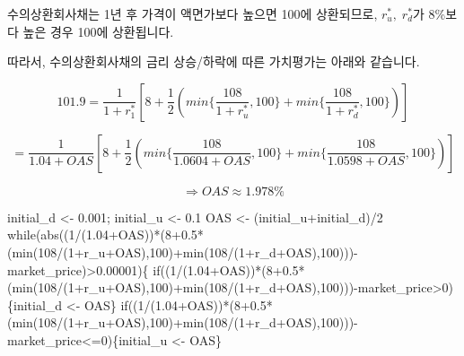 \documentclass[
  a4paper,
  DIV=11,
  numbers=noendperiod]{scrreprt}
\newenvironment{Shaded}{\begin{snugshade}}{\end{snugshade}}
\newcommand{\ControlFlowTok}[1]{\textcolor[rgb]{0.00,0.23,0.31}{#1}}
\newcommand{\DecValTok}[1]{\textcolor[rgb]{0.68,0.00,0.00}{#1}}
\newcommand{\FloatTok}[1]{\textcolor[rgb]{0.68,0.00,0.00}{#1}}
\newcommand{\FunctionTok}[1]{\textcolor[rgb]{0.28,0.35,0.67}{#1}}
\newcommand{\NormalTok}[1]{\textcolor[rgb]{0.00,0.23,0.31}{#1}}
\newcommand{\OtherTok}[1]{\textcolor[rgb]{0.00,0.23,0.31}{#1}}
\newcommand{\SpecialCharTok}[1]{\textcolor[rgb]{0.37,0.37,0.37}{#1}}
\begin{document}
수의상환회사채는 1년 후 가격이 액면가보다 높으면 100에 상환되므로,
\(r_u^*,\;r_d^*\)가 8\%보다 높은 경우 100에 상환됩니다.

따라서, 수의상환회사채의 금리 상승/하락에 따른 가치평가는 아래와
같습니다.

\[101.9=\frac{1}{1+r_1^*}[8+\frac{1}{2}(min\{\frac{108}{1+r_u^*},100\}+min\{\frac{108}{1+r_d^*},100\})]\]

\[=\frac{1}{1.04+OAS}[8+\frac{1}{2}(min\{\frac{108}{1.0604+OAS},100\}+min\{\frac{108}{1.0598+OAS},100\})]\]

\[\Rightarrow OAS\approx 1.978\%\]

\begin{Shaded}
\begin{Highlighting}[]
\NormalTok{initial\_d }\OtherTok{\textless{}{-}} \FloatTok{0.001}\NormalTok{; initial\_u }\OtherTok{\textless{}{-}} \FloatTok{0.1}
\NormalTok{OAS }\OtherTok{\textless{}{-}}\NormalTok{ (initial\_u}\SpecialCharTok{+}\NormalTok{initial\_d)}\SpecialCharTok{/}\DecValTok{2}
\ControlFlowTok{while}\NormalTok{(}\FunctionTok{abs}\NormalTok{((}\DecValTok{1}\SpecialCharTok{/}\NormalTok{(}\FloatTok{1.04}\SpecialCharTok{+}\NormalTok{OAS))}\SpecialCharTok{*}\NormalTok{(}\DecValTok{8}\FloatTok{+0.5}\SpecialCharTok{*}\NormalTok{(}\FunctionTok{min}\NormalTok{(}\DecValTok{108}\SpecialCharTok{/}\NormalTok{(}\DecValTok{1}\SpecialCharTok{+}\NormalTok{r\_u}\SpecialCharTok{+}\NormalTok{OAS),}\DecValTok{100}\NormalTok{)}\SpecialCharTok{+}\FunctionTok{min}\NormalTok{(}\DecValTok{108}\SpecialCharTok{/}\NormalTok{(}\DecValTok{1}\SpecialCharTok{+}\NormalTok{r\_d}\SpecialCharTok{+}\NormalTok{OAS),}\DecValTok{100}\NormalTok{)))}\SpecialCharTok{{-}}\NormalTok{market\_price)}\SpecialCharTok{\textgreater{}}\FloatTok{0.00001}\NormalTok{)\{}
  \ControlFlowTok{if}\NormalTok{((}\DecValTok{1}\SpecialCharTok{/}\NormalTok{(}\FloatTok{1.04}\SpecialCharTok{+}\NormalTok{OAS))}\SpecialCharTok{*}\NormalTok{(}\DecValTok{8}\FloatTok{+0.5}\SpecialCharTok{*}\NormalTok{(}\FunctionTok{min}\NormalTok{(}\DecValTok{108}\SpecialCharTok{/}\NormalTok{(}\DecValTok{1}\SpecialCharTok{+}\NormalTok{r\_u}\SpecialCharTok{+}\NormalTok{OAS),}\DecValTok{100}\NormalTok{)}\SpecialCharTok{+}\FunctionTok{min}\NormalTok{(}\DecValTok{108}\SpecialCharTok{/}\NormalTok{(}\DecValTok{1}\SpecialCharTok{+}\NormalTok{r\_d}\SpecialCharTok{+}\NormalTok{OAS),}\DecValTok{100}\NormalTok{)))}\SpecialCharTok{{-}}\NormalTok{market\_price}\SpecialCharTok{\textgreater{}}\DecValTok{0}\NormalTok{)\{initial\_d }\OtherTok{\textless{}{-}}\NormalTok{ OAS\}}
  \ControlFlowTok{if}\NormalTok{((}\DecValTok{1}\SpecialCharTok{/}\NormalTok{(}\FloatTok{1.04}\SpecialCharTok{+}\NormalTok{OAS))}\SpecialCharTok{*}\NormalTok{(}\DecValTok{8}\FloatTok{+0.5}\SpecialCharTok{*}\NormalTok{(}\FunctionTok{min}\NormalTok{(}\DecValTok{108}\SpecialCharTok{/}\NormalTok{(}\DecValTok{1}\SpecialCharTok{+}\NormalTok{r\_u}\SpecialCharTok{+}\NormalTok{OAS),}\DecValTok{100}\NormalTok{)}\SpecialCharTok{+}\FunctionTok{min}\NormalTok{(}\DecValTok{108}\SpecialCharTok{/}\NormalTok{(}\DecValTok{1}\SpecialCharTok{+}\NormalTok{r\_d}\SpecialCharTok{+}\NormalTok{OAS),}\DecValTok{100}\NormalTok{)))}\SpecialCharTok{{-}}\NormalTok{market\_price}\SpecialCharTok{\textless{}=}\DecValTok{0}\NormalTok{)\{initial\_u }\OtherTok{\textless{}{-}}\NormalTok{ OAS\}}

\end{Highlighting}
\end{Shaded}
\end{document}
